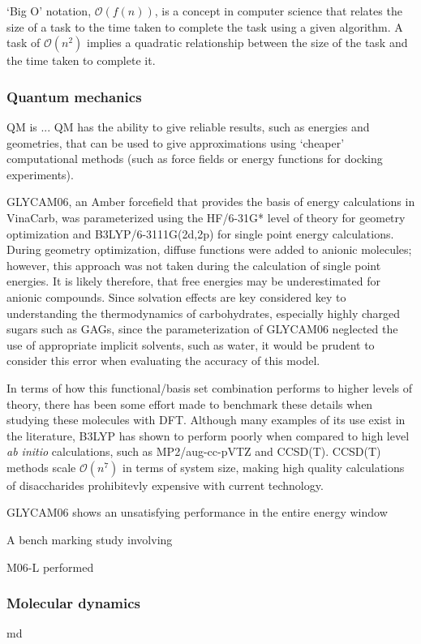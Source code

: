 \documentclass[journal=jctcce,manuscript=article]{achemso}
\begin{document}
{`Big O'  notation, $\mathcal{O}(f(n))$, is a concept in computer science that relates the size of a task to the time taken to complete the task using a given algorithm. A task of $\mathcal{O}(n^{2})$ implies a quadratic relationship between the size of the task and the time taken to complete it.

\subsubsection{Quantum mechanics}
\Ac{QM} is ...
\Ac{QM} has the ability to give reliable results, such as energies and geometries, that can be used to give approximations using `cheaper' computational methods (such as force fields or energy functions for docking experiments). 

GLYCAM06, an Amber forcefield that provides the basis of energy calculations in VinaCarb, was parameterized using the HF/6-31G* level of theory for geometry optimization and B3LYP/6-3111G(2d,2p) for single point energy calculations\cite{Kirschner2008GLYCAM06:Carbohydrates}. 
During geometry optimization, diffuse functions were added to anionic molecules; however, this approach was not taken during the calculation of single point energies. It is likely therefore, that free energies may be underestimated for anionic compounds. Since solvation effects are key considered key to understanding the thermodynamics of carbohydrates, especially highly charged sugars such as \acp{GAG}, since the parameterization of GLYCAM06 neglected the use of appropriate implicit solvents, such as water, it would be prudent to consider this error when evaluating the accuracy of this model. 

In terms of how this functional/basis set combination performs to higher levels of theory, there has been some effort made to benchmark these details when studying these molecules with \ac{DFT}. Although many examples of its use exist in the literature, B3LYP has shown to perform poorly when compared to high level \textit{ab initio} calculations, such as MP2/aug-cc-pVTZ and CCSD(T). CCSD(T) methods scale $\mathcal{O}(n^{7})$ in terms of system size, making high quality calculations of disaccharides prohibitevly expensive with current technology. 

GLYCAM06 shows an unsatisfying performance in the entire energy window

A bench marking study involving 

M06-L performed 

\subsubsection{Molecular dynamics}
\Ac{md}

}
\end{document}
